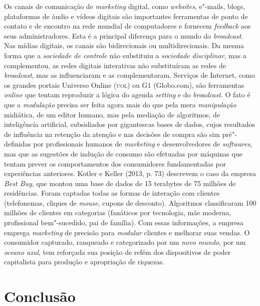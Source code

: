 Os canais de comunicação de \emph{marketing} digital, como
\emph{websites}, e"-mails, blogs, plataformas de áudio e vídeos digitais
são importantes ferramentas de ponto de contato e de encontro na rede
mundial de computadores e fornecem \emph{feedback} aos seus
administradores. Esta é a principal diferença para o mundo do
\emph{broadcast}. Nas mídias digitais, os canais são bidirecionais ou
multidirecionais. Da mesma forma que a \emph{sociedade de controle} não
substituiu a \emph{sociedade disciplinar}, mas a complementou, as redes
digitais interativas não substituíram as redes de \emph{broadcast}, mas
as influenciaram e as complementaram. Serviços de Internet, como os
grandes portais Universo Online (\textsc{uol}) ou G1 (Globo.com), são ferramentas
\emph{online} que tentam reproduzir a lógica do agenda \emph{setting} e
do \emph{broadcast}. O fato é que a \emph{modulação} precisa ser feita
agora mais do que pela mera \emph{manipulação} midiática, de um editor
humano, mas pela mediação de algoritmos, de inteligência artificial,
subsidiados por gigantescas bases de dados, cujos resultados de
influência na retenção da atenção e nas decisões de compra são sim
pré"-definidas por profissionais humanos de \emph{marketing} e
desenvolvedores de \emph{softwares}, mas que as sugestões de indução de
consumo são efetuadas por máquinas que tentam prever os comportamentos
dos consumidores fundamentadas por experiências anteriores. Kotler e
Keller (2013, p. 73) descrevem o caso da empresa \emph{Best Buy}, que
montou uma base de dados de 15 terabytes de 75 milhões de residências.
Foram captadas todas as formas de interação com clientes (telefonemas,
cliques de \emph{mouse}, cupons de desconto). Algoritmos classificaram
100 milhões de clientes em categorias (fanáticos por tecnologia, mãe
moderna, profissional bem"-sucedido, pai de família). Com essas
informações, a empresa emprega \emph{marketing} de precisão para
\emph{modular} clientes e melhorar suas vendas. O consumidor capturado,
ranqueado e categorizado por um \emph{novo mundo}, por um \emph{oceano
azul}, tem reforçada sua posição de refém dos dispositivos de poder
capitalista para produção e apropriação de riquezas.

\section{Conclusão}

